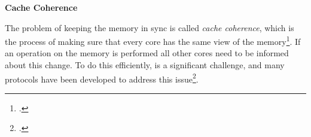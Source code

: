 \textbf{Cache Coherence}

The problem of keeping the memory in sync is called \textit{cache coherence},
which is the process of making sure that every core has the same view of the memory\footcite{prof.dr.benh.juurlinkLectureCacheCoherence2018}.
If an operation on the memory is performed all other cores need to be informed about this change.
To do this efficiently, is a significant challenge, and many protocols have been developed to address this issue\footcite{hennessyComputerArchitectureQuantitative2011}.





